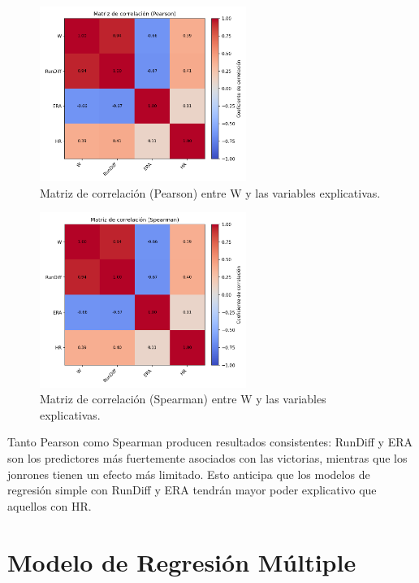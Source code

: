 \documentclass[man,floatsintext]{apa7}
\begin{document}
\begin{figure}[H]
    \centering
    \includegraphics[width=0.6\textwidth]{../plots/final_version/heatmap_corr_pearson.png}
    \caption{Matriz de correlación (Pearson) entre W y las variables explicativas.}
    \label{fig:heatmap_pearson}
\end{figure}

\begin{figure}[H]
    \centering
    \includegraphics[width=0.6\textwidth]{../plots/final_version/heatmap_corr_spearman.png}
    \caption{Matriz de correlación (Spearman) entre W y las variables explicativas.}
    \label{fig:heatmap_spearman}
\end{figure}

Tanto Pearson como Spearman producen resultados consistentes: RunDiff y ERA son los predictores más fuertemente asociados con las victorias, mientras que los jonrones tienen un efecto más limitado. Esto anticipa que los modelos de regresión simple con RunDiff y ERA tendrán mayor poder explicativo que aquellos con HR.
\section{Modelo de Regresión Múltiple}
\end{document}
